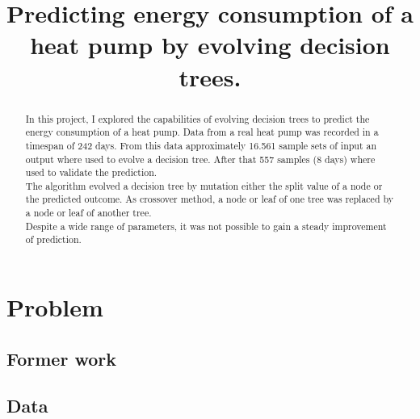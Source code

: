 \documentclass[conference]{IEEEtran}
\begin{document}
%
\title{Predicting energy consumption of a heat pump
by evolving decision trees.}


\author{
}

\maketitle


\begin{abstract}
In this project, I explored the capabilities of evolving decision trees to predict the energy consumption of a heat pump. Data from a real heat pump was recorded in a timespan of 242 days. From this data approximately 16.561 sample sets of input an output where used to evolve a decision tree. After that 557 samples (8 days) where used to validate the prediction.\\
The algorithm evolved a decision tree by mutation either the split value of a node or the predicted outcome. As crossover method, a node or leaf of one tree was replaced by a node or leaf of another tree.\\
Despite a wide range of parameters, it was not possible to gain a steady improvement of prediction. 
\end{abstract}
\IEEEpeerreviewmaketitle



\section{Problem}

\subsection{Former work}

\subsection{Data}
\end{document}
